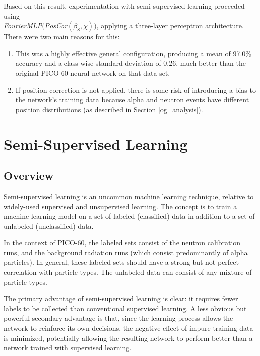 \documentclass[10pt]{article}
\begin{document}
Based on this result, experimentation with semi-supervised learning proceeded using \\ {\it FourierMLP}$(${\it PosCor}$(\beta_{8}, \chi))$, applying a three-layer perceptron architecture. There were two main reasons for this:

\begin{enumerate}
    \item This was a highly effective general configuration, producing a mean of 97.0\% accuracy and a class-wise standard deviation of 0.26, much better than the original PICO-60 neural network on that data set.
    \item If position correction is not applied, there is some risk of introducing a bias to the network's training data because alpha and neutron events have different position distributions (as described in Section \ref{og_analysis}).
\end{enumerate}

\section{Semi-Supervised Learning} \label{semi_supervised}

\subsection{Overview}

Semi-supervised learning is an uncommon machine learning technique, relative to widely-used supervised and unsupervised learning. The concept is to train a machine learning model on a set of labeled (classified) data in addition to a set of unlabeled (unclassified) data.

In the context of PICO-60, the labeled sets consist of the neutron calibration runs, and the background radiation runs (which consist predominantly of alpha particles). In general, these labeled sets should have a strong but not perfect correlation with particle types. The unlabeled data can consist of any mixture of particle types.

The primary advantage of semi-supervised learning is clear: it requires fewer labels to be collected than conventional supervised learning. A less obvious but powerful secondary advantage is that, since the learning process allows the network to reinforce its own decisions, the negative effect of impure training data is minimized, potentially allowing the resulting network to perform better than a network trained with supervised learning.
\end{document}
